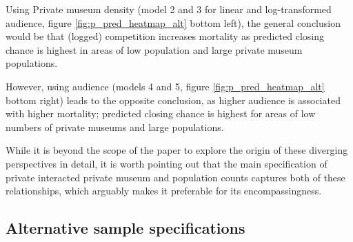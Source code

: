 \documentclass[12pt]{article}
\begin{document}
Using Private museum density (model 2 and 3 for linear and log-transformed audience, figure \ref{fig:p_pred_heatmap_alt} bottom left), the general conclusion would be that (logged) competition increases mortality as predicted closing chance is highest in areas of low population and large private museum populations.

However, using audience (models 4 and 5, figure \ref{fig:p_pred_heatmap_alt} bottom right) leads to the opposite conclusion, as higher audience is associated with higher mortality; predicted closing chance is highest for areas of low numbers of private museums and large populations.

While it is beyond the scope of the paper to explore the origin of these diverging perspectives in detail, it is worth pointing out that the main specification of private interacted private museum and population counts captures both of these relationships, which arguably makes it preferable for its encompassingness.
\subsection*{Alternative sample specifications}
\end{document}
